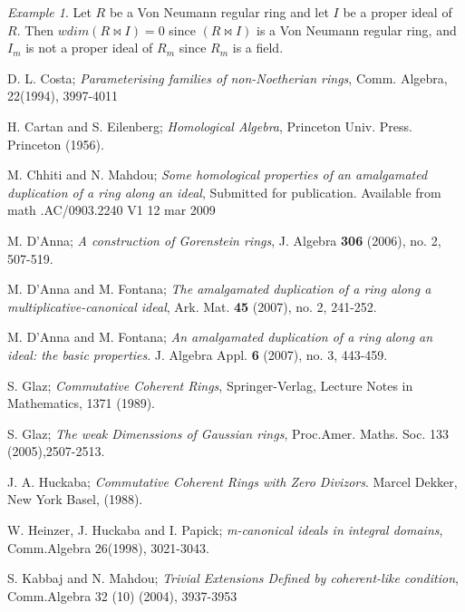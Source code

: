 \documentclass{amsart}
\theoremstyle{definition}
\theoremstyle{remark}
\newtheorem{example}[theorem]{Example}
\theoremstyle{Definition and Notation}
\begin{document}
\begin{example}Let $R$ be a Von Neumann regular ring and let $I$ be a proper
ideal of $R$. Then $wdim(R\bowtie I)=0$ since $(R\bowtie I)$ is a
Von Neumann regular ring, and $I_{m}$ is not a proper ideal  of
$R_{m}$ since $R_{m}$ is a field.
\end{example}


\begin{thebibliography}{10}

 D. L. Costa; \textit{Parameterising families of
      non-Noetherian rings}, Comm. Algebra, 22(1994), 3997-4011

       H. Cartan and S. Eilenberg; \textit{Homological Algebra},
      Princeton Univ. Press. Princeton (1956).

       M. Chhiti and N. Mahdou; \textit{Some homological
      properties of an amalgamated duplication of a ring along an
      ideal}, Submitted for publication. Available from math
      .AC/0903.2240 V1 12 mar 2009

        M. D'Anna; \textit{A construction of Gorenstein rings}, J. Algebra {\bf 306} (2006), no. 2, 507-519.

        M. D'Anna and M. Fontana; \textit{The amalgamated duplication
       of a ring along a multiplicative-canonical ideal}, Ark. Mat. {\bf 45} (2007), no. 2, 241-252.

        M. D'Anna and M. Fontana; \textit{An amalgamated duplication
      of a ring along an ideal: the basic properties}. J. Algebra Appl. {\bf 6} (2007), no. 3, 443-459.

       S. Glaz; \textit{Commutative Coherent Rings},
     Springer-Verlag, Lecture Notes in Mathematics, 1371 (1989).

      S. Glaz; \textit{The weak Dimenssions of Gaussian
     rings}, Proc.Amer. Maths. Soc. 133 (2005),2507-2513.

       J. A. Huckaba; \textit{Commutative Coherent Rings with Zero
     Divizors}. Marcel Dekker, New York Basel, (1988).

      W. Heinzer, J. Huckaba and I. Papick; \textit{m-canonical
      ideals in integral domains}, Comm.Algebra 26(1998), 3021-3043.

       S. Kabbaj and N. Mahdou; \textit{Trivial Extensions Defined by coherent-like condition},
      Comm.Algebra 32 (10) (2004), 3937-3953


\end{thebibliography}
\end{document}
